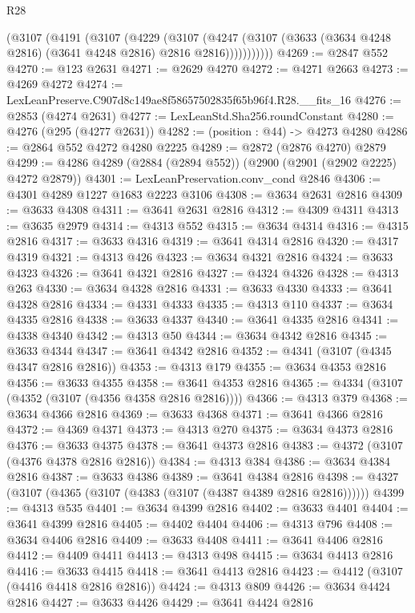 \begin{lexlean}{R28}
\begin{coremodule}
          (@3107
            (@4191
              (@3107
                (@4229
                  (@3107
                    (@4247
                      (@3107 (@3633 (@3634 @4248 @2816) (@3641 @4248 @2816) @2816 @2816)))))))))))
@4269 := @2847 @552
@4270 := @123 @2631
@4271 := @2629 @4270
@4272 := @4271 @2663
@4273 := @4269 @4272
@4274 := LexLeanPreserve.C907d8c149ae8f58657502835f65b96f4.R28.__fits_16
@4276 := @2853 (@4274 @2631)
@4277 := LexLeanStd.Sha256.roundConstant
@4280 := @4276 (@295 (@4277 @2631))
@4282 := (position : @44) -> @4273 @4280
@4286 := @2864 @552 @4272 @4280 @2225
@4289 := @2872 (@2876 @4270) @2879
@4299 := @4286 @4289 (@2884 (@2894 @552)) (@2900 (@2901 (@2902 @2225) @4272 @2879))
@4301 := LexLeanPreservation.conv_cond @2846
@4306 := @4301 @4289 @1227 @1683 @2223 @3106
@4308 := @3634 @2631 @2816
@4309 := @3633 @4308
@4311 := @3641 @2631 @2816
@4312 := @4309 @4311
@4313 := @3635 @2979
@4314 := @4313 @552
@4315 := @3634 @4314
@4316 := @4315 @2816
@4317 := @3633 @4316
@4319 := @3641 @4314 @2816
@4320 := @4317 @4319
@4321 := @4313 @426
@4323 := @3634 @4321 @2816
@4324 := @3633 @4323
@4326 := @3641 @4321 @2816
@4327 := @4324 @4326
@4328 := @4313 @263
@4330 := @3634 @4328 @2816
@4331 := @3633 @4330
@4333 := @3641 @4328 @2816
@4334 := @4331 @4333
@4335 := @4313 @110
@4337 := @3634 @4335 @2816
@4338 := @3633 @4337
@4340 := @3641 @4335 @2816
@4341 := @4338 @4340
@4342 := @4313 @50
@4344 := @3634 @4342 @2816
@4345 := @3633 @4344
@4347 := @3641 @4342 @2816
@4352 := @4341 (@3107 (@4345 @4347 @2816 @2816))
@4353 := @4313 @179
@4355 := @3634 @4353 @2816
@4356 := @3633 @4355
@4358 := @3641 @4353 @2816
@4365 := @4334 (@3107 (@4352 (@3107 (@4356 @4358 @2816 @2816))))
@4366 := @4313 @379
@4368 := @3634 @4366 @2816
@4369 := @3633 @4368
@4371 := @3641 @4366 @2816
@4372 := @4369 @4371
@4373 := @4313 @270
@4375 := @3634 @4373 @2816
@4376 := @3633 @4375
@4378 := @3641 @4373 @2816
@4383 := @4372 (@3107 (@4376 @4378 @2816 @2816))
@4384 := @4313 @384
@4386 := @3634 @4384 @2816
@4387 := @3633 @4386
@4389 := @3641 @4384 @2816
@4398 := @4327 (@3107 (@4365 (@3107 (@4383 (@3107 (@4387 @4389 @2816 @2816))))))
@4399 := @4313 @535
@4401 := @3634 @4399 @2816
@4402 := @3633 @4401
@4404 := @3641 @4399 @2816
@4405 := @4402 @4404
@4406 := @4313 @796
@4408 := @3634 @4406 @2816
@4409 := @3633 @4408
@4411 := @3641 @4406 @2816
@4412 := @4409 @4411
@4413 := @4313 @498
@4415 := @3634 @4413 @2816
@4416 := @3633 @4415
@4418 := @3641 @4413 @2816
@4423 := @4412 (@3107 (@4416 @4418 @2816 @2816))
@4424 := @4313 @809
@4426 := @3634 @4424 @2816
@4427 := @3633 @4426
@4429 := @3641 @4424 @2816

\end{coremodule}
\end{lexlean}
